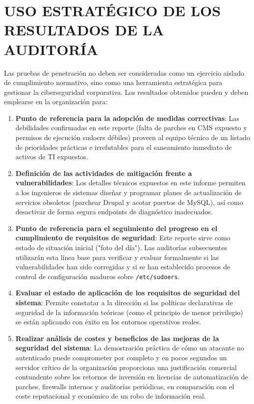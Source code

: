 \documentclass[11pt,a4paper]{article}
\begin{document}
\section{USO ESTRATÉGICO DE LOS RESULTADOS DE LA AUDITORÍA}
Las pruebas de penetración no deben ser consideradas como un ejercicio aislado de cumplimiento normativo, sino como una herramienta estratégica para gestionar la ciberseguridad corporativa. Los resultados obtenidos pueden y deben emplearse en la organización para:
\begin{enumerate}
    \item \textbf{Punto de referencia para la adopción de medidas correctivas}: Las debilidades confirmadas en este reporte (falta de parches en CMS expuesto y permisos de ejecución sudoers débiles) proveen al equipo técnico de un listado de prioridades prácticas e irrefutables para el saneamiento inmediato de activos de TI expuestos.
    \item \textbf{Definición de las actividades de mitigación frente a vulnerabilidades}: Los detalles técnicos expuestos en este informe permiten a los ingenieros de sistemas diseñar y programar planes de actualización de servicios obsoletos (parchear Drupal y acotar puertos de MySQL), así como desactivar de forma segura endpoints de diagnóstico inadecuados.
    \item \textbf{Punto de referencia para el seguimiento del progreso en el cumplimiento de requisitos de seguridad}: Este reporte sirve como estado de situación inicial ("foto del día"). Las auditorías subsecuentes utilizarán esta línea base para verificar y evaluar formalmente si las vulnerabilidades han sido corregidas y si se han establecido procesos de control de configuración maduros sobre \texttt{/etc/sudoers}.
    \item \textbf{Evaluar el estado de aplicación de los requisitos de seguridad del sistema}: Permite constatar a la dirección si las políticas declarativas de seguridad de la información teóricas (como el principio de menor privilegio) se están aplicando con éxito en los entornos operativos reales.
    \item \textbf{Realizar análisis de costes y beneficios de las mejoras de la seguridad del sistema}: La demostración práctica de cómo un atacante no autenticado puede comprometer por completo y en pocos segundos un servidor crítico de la organización proporciona una justificación comercial contundente sobre los retornos de inversión en licencias de automatización de parches, firewalls internos y auditorías periódicas, en comparación con el coste reputacional y económico de un robo de información real.
\end{enumerate}
\end{document}
